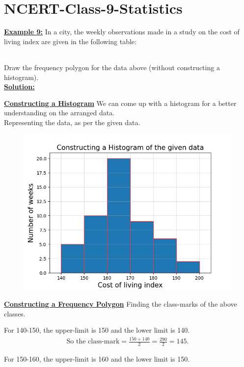 \documentclass[journal,12pt,twocolumn]{IEEEtran}
\begin{document}
	\section{NCERT-Class-9-Statistics}
\textbf{\underline{Example 9:}} In a city, the weekly observations made in a study on the cost of living index are given in the following table:
\begin{table}[!htb]

\end{table}\\
Draw the frequency polygon for the data above (without constructing a histogram).\\
	\textbf{\underline{Solution:} }
	\itemize
	\item\textbf{\underline{Constructing a Histogram}} We can come up with a histogram for a better understanding on the arranged data.\\ Representing the data, as per the given data.
	\begin{figure}[!ht] 
		\centering
		\includegraphics[width=\columnwidth]{Fig_1}
		\label{fig:1}
	\end{figure}
	\item\textbf{\underline{Constructing a Frequency Polygon}} Finding the class-marks of the above classes.\\
	\itemize
	\item For 140-150, the upper-limit is 150 and the lower limit is 140.
	\begin{align*}
	\text{So the class-mark}=\frac{150+140}{2}=\frac{290}{2}=145.
	\end{align*}
	\item For 150-160, the upper-limit is 160 and the lower limit is 150.
\end{document}

